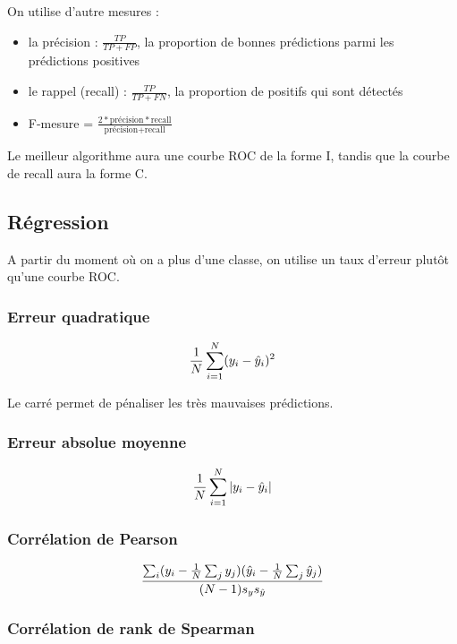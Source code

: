 	On utilise d'autre mesures :
	
	\begin{itemize}
		\item la précision : $\frac{TP}{TP + FP}$, la proportion de bonnes prédictions parmi les prédictions positives
		\item le rappel (recall) : $\frac{TP}{TP + FN}$, la proportion de positifs qui sont détectés
		\item F-mesure = $\frac{2 * \text{précision} * \text{recall}}{\text{précision} + \text{recall}}$
	\end{itemize}
	
	
	Le meilleur algorithme aura une courbe ROC de la forme {\pigpenfont I}, tandis que la courbe de recall aura la forme {\pigpenfont C}.
	
	\subsection{Régression}
	
		A partir du moment où on a plus d'une classe, on utilise un taux d'erreur plutôt qu'une courbe ROC.
	
		\subsubsection{Erreur quadratique}
		
		$$\frac{1}{N} \sum_{i = 1}^N (y_i - \hat{y}_i)^2$$
		
		Le carré permet de pénaliser les très mauvaises prédictions.
		
		\subsubsection{Erreur absolue moyenne}
		
		$$\frac{1}{N} \sum_{i = 1}^N \vert y_i - \hat{y}_i \vert$$
		
		\subsubsection{Corrélation de Pearson}
		
		$$\frac{\sum_i (y_i - \frac{1}{N} \sum_j y_j)(\hat{y}_i - \frac{1}{N} \sum_j \hat{y}_j)}{(N - 1)s_y s_{\hat{y}} }$$
		 		
		\subsubsection{Corrélation de rank de Spearman}
		
